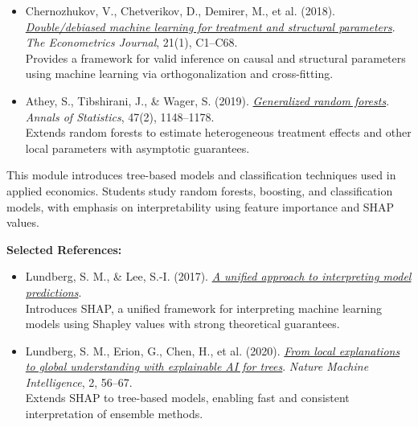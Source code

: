 \documentclass[11pt]{article}
\begin{document}
\begin{description}[leftmargin=0cm, labelindent=0cm, itemsep=1em]
\begin{itemize}[leftmargin=1.5em]
\item Chernozhukov, V., Chetverikov, D., Demirer, M., et al. (2018).
\href{https://doi.org/10.1111/ectj.12097}{\textit{Double/debiased machine learning for treatment and structural parameters}}.
\textit{The Econometrics Journal}, 21(1), C1--C68. \\
Provides a framework for valid inference on causal and structural parameters using machine learning via orthogonalization and cross-fitting.

\item Athey, S., Tibshirani, J., \& Wager, S. (2019).
\href{https://doi.org/10.1214/18-AOS1709}{\textit{Generalized random forests}}.
\textit{Annals of Statistics}, 47(2), 1148--1178. \\
Extends random forests to estimate heterogeneous treatment effects and other local parameters with asymptotic guarantees.

\end{itemize}


\item[\textbf{Module 5: Tree-Based Methods, Classification, and Interpretability}]
This module introduces tree-based models and classification techniques used in applied economics. Students study random forests, boosting, and classification models, with emphasis on interpretability using feature importance and SHAP values.

\vspace{0.3em}
\textbf{Selected References:}
\begin{itemize}[leftmargin=1.5em]

\item Lundberg, S. M., \& Lee, S.-I. (2017).
\href{https://doi.org/10.48550/arXiv.1705.07874}{\textit{A unified approach to interpreting model predictions}}. \\
Introduces SHAP, a unified framework for interpreting machine learning models using Shapley values with strong theoretical guarantees.

\item Lundberg, S. M., Erion, G., Chen, H., et al. (2020).
\href{https://doi.org/10.1038/s42256-019-0138-9}{\textit{From local explanations to global understanding with explainable AI for trees}}.
\textit{Nature Machine Intelligence}, 2, 56--67. \\
Extends SHAP to tree-based models, enabling fast and consistent interpretation of ensemble methods.


\end{itemize}
\end{description}
\end{document}
